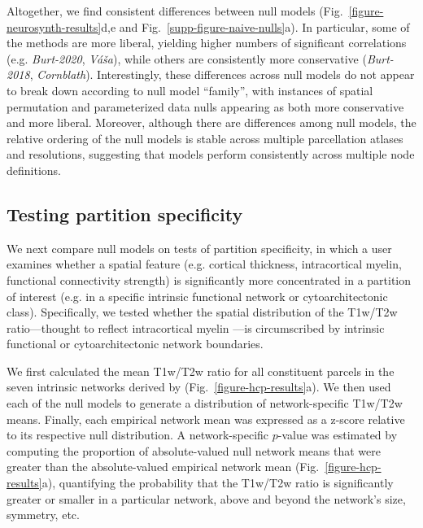 \documentclass[12pt,aps,pra,reprint,showkeys]{revtex4-1}
\begin{document}
Altogether, we find consistent differences between null models (Fig.~\ref{figure-neurosynth-results}d,e and Fig.~\ref{supp-figure-naive-nulls}a).
In particular, some of the methods are more liberal, yielding higher numbers of significant correlations (e.g. \textit{Burt-2020}, \textit{V\'a\v{s}a}), while others are consistently more conservative (\textit{Burt-2018}, \textit{Cornblath}).
Interestingly, these differences across null models do not appear to break down according to null model ``family'', with instances of spatial permutation and parameterized data nulls appearing as both more conservative and more liberal.
Moreover, although there are differences among null models, the relative ordering of the null models is stable across multiple parcellation atlases and resolutions, suggesting that models perform consistently across multiple node definitions.

\subsection*{Testing partition specificity}

We next compare null models on tests of partition specificity, in which a user examines whether a spatial feature (e.g. cortical thickness, intracortical myelin, functional connectivity strength) is significantly more concentrated in a partition of interest (e.g. in a specific intrinsic functional network or cytoarchitectonic class).
Specifically, we tested whether the spatial distribution of the T1w/T2w ratio---thought to reflect intracortical myelin \citep{glasser2011jneuro}---is circumscribed by intrinsic functional \citep{yeo2011organization} or cytoarchitectonic \citep{voneconomo1925cytoarchitecture, scholtens2018neuroimage} network boundaries.

We first calculated the mean T1w/T2w ratio for all constituent parcels in the seven intrinsic networks derived by \citet{yeo2011organization} (Fig.~\ref{figure-hcp-results}a).
We then used each of the null models to generate a distribution of network-specific T1w/T2w means.
Finally, each empirical network mean was expressed as a z-score relative to its respective null distribution.
A network-specific $p$-value was estimated by computing the proportion of absolute-valued null network means that were greater than the absolute-valued empirical network mean (Fig.~\ref{figure-hcp-results}a), quantifying the probability that the T1w/T2w ratio is significantly greater or smaller in a particular network, above and beyond the network's size, symmetry, etc.
\end{document}
